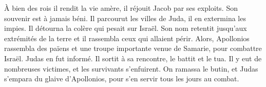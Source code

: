 À bien des rois il rendit la vie amère, il réjouit Jacob par ses exploits.
	Son souvenir est à jamais béni.
Il parcourut les villes de Juda, il en extermina les impies.
	Il détourna la colère qui pesait sur Israël.
Son nom retentit jusqu’aux extrémités de la terre
	et il rassembla ceux qui allaient périr.
Alors, Apollonios rassembla des païens et une troupe importante venue de Samarie,
	pour combattre Israël.
Judas en fut informé. Il sortit à sa rencontre, le battit et le tua.
	Il y eut de nombreuses victimes, et les survivants s’enfuirent.
On ramassa le butin, et Judas s’empara du glaive d’Apollonios,
	pour s’en servir tous les jours au combat.
